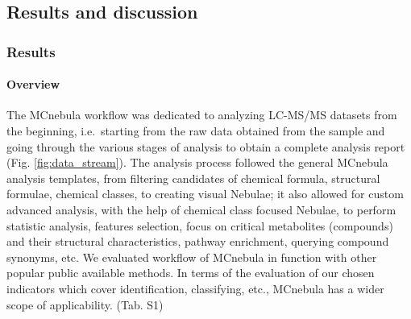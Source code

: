 \documentclass[
]{article}
\begin{document}
\hypertarget{results-and-discussion}{%
\subsection{Results and discussion}\label{results-and-discussion}}

\hypertarget{results}{%
\subsubsection{Results}\label{results}}

\hypertarget{overview}{%
\paragraph{Overview}\label{overview}}

The MCnebula workflow was dedicated to analyzing LC-MS/MS datasets from
the beginning, i.e.~starting from the raw data obtained from the sample
and going through the various stages of analysis to obtain a complete
analysis report (Fig. \ref{fig:data_stream}). The analysis process
followed the general MCnebula analysis templates, from filtering
candidates of chemical formula, structural formulae, chemical classes,
to creating visual Nebulae; it also allowed for custom advanced
analysis, with the help of chemical class focused Nebulae, to perform
statistic analysis, features selection, focus on critical metabolites
(compounds) and their structural characteristics, pathway enrichment,
querying compound synonyms, etc. We evaluated workflow of MCnebula in
function with other popular public available methods. In terms of the
evaluation of our chosen indicators which cover identification,
classifying, etc., MCnebula has a wider scope of applicability. (Tab.
S1)
\end{document}
